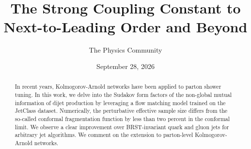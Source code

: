 \documentclass[11pt]{article}
\title{The Strong Coupling Constant to Next-to-Leading Order and Beyond}
\author{The Physics Community}
\date{September 28, 2026}
\numberwithin{equation}{section}
\theoremstyle{definition}
\theoremstyle{remark}
\begin{document}
\maketitle
\begin{abstract}
In recent years, Kolmogorov-Arnold networks have been applied to parton
shower tuning. In this work, we delve into the Sudakov form factors of
the non-global mutual information of dijet production by leveraging a
flow matching model trained on the JetClass dataset. Numerically, the
perturbative effective sample size differs from the so-called conformal
fragmentation function by less than two percent in the conformal limit.
We observe a clear improvement over BRST-invariant quark and gluon jets
for arbitrary jet algorithms. We comment on the extension to
parton-level Kolmogorov-Arnold networks.
\end{abstract}
\tableofcontents






\nocite{*}


\end{document}
